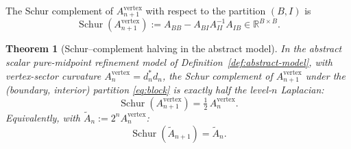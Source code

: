 \documentclass[11pt]{article}
\theoremstyle{plain}
\newtheorem{theorem}{Theorem}[section]
\theoremstyle{definition}
\theoremstyle{remark}
\newcommand{\R}{\mathbb{R}}
\newcommand{\Schur}{\operatorname{Schur}}
\begin{document}
The Schur complement of $A_{n+1}^{\mathrm{vertex}}$ with respect to
the partition $(B, I)$ is
\begin{equation}\label{eq:SchurDef}
   \Schur(A_{n+1}^{\mathrm{vertex}}) :=
     A_{BB} - A_{BI} A_{II}^{-1} A_{IB}
     \in \R^{B \times B}.
\end{equation}

\begin{theorem}[Schur--complement halving in the abstract model]\label{thm:schur}
In the abstract scalar pure-midpoint refinement model of
Definition~\ref{def:abstract-model}, with vertex-sector curvature
$A_n^{\mathrm{vertex}} = d_n^{*} d_n$, the Schur complement of
$A_{n+1}^{\mathrm{vertex}}$ under the (boundary, interior) partition
\eqref{eq:block} is exactly half the level-$n$ Laplacian:
\begin{equation}\label{eq:schur-half}
   \Schur(A_{n+1}^{\mathrm{vertex}}) =
     \tfrac12 \, A_n^{\mathrm{vertex}}.
\end{equation}
Equivalently, with $\widetilde A_n := 2^n A_n^{\mathrm{vertex}}$:
\begin{equation}\label{eq:schur-tilde}
   \Schur(\widetilde A_{n+1}) = \widetilde A_n.
\end{equation}
\end{theorem}
\end{document}
